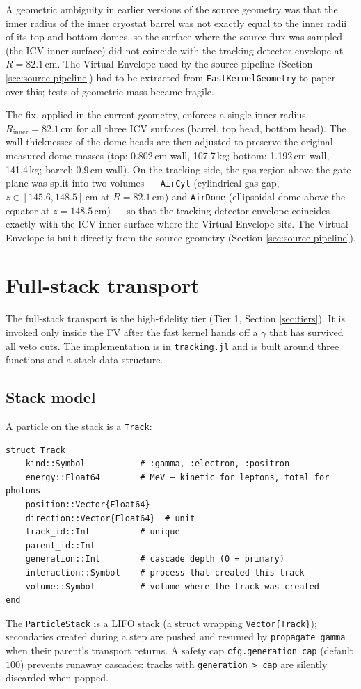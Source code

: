 \documentclass[11pt]{article}
\begin{document}
A geometric ambiguity in earlier versions of the source geometry was that
the inner radius of the inner cryostat barrel was not exactly equal to the
inner radii of its top and bottom domes, so the surface where the source
flux was sampled (the ICV inner surface) did not coincide with the tracking
detector envelope at $R = 82.1$\,cm. The Virtual Envelope used by the source
pipeline (Section \ref{sec:source-pipeline}) had to be extracted from
\texttt{FastKernelGeometry} to paper over this; tests of geometric mass
became fragile.

The fix, applied in the current geometry, enforces a single inner radius
$R_{\mathrm{inner}} = 82.1$\,cm for all three ICV surfaces (barrel, top
head, bottom head). The wall thicknesses of the dome heads are then adjusted
to preserve the original measured dome masses (top: 0.802\,cm wall, 107.7\,kg;
bottom: 1.192\,cm wall, 141.4\,kg; barrel: 0.9\,cm wall). On the tracking
side, the gas region above the gate plane was split into two volumes ---
\texttt{AirCyl} (cylindrical gas gap, $z \in [145.6, 148.5]$\,cm at
$R = 82.1$\,cm) and \texttt{AirDome} (ellipsoidal dome above the equator at
$z = 148.5$\,cm) --- so that the tracking detector envelope coincides
exactly with the ICV inner surface where the Virtual Envelope sits. The
Virtual Envelope is built directly from the source geometry (Section
\ref{sec:source-pipeline}).

\section{Full-stack transport}
\label{sec:fullstack}

The full-stack transport is the high-fidelity tier (Tier 1, Section
\ref{sec:tiers}). It is invoked only inside the FV after the fast kernel
hands off a $\gamma$ that has survived all veto cuts. The implementation is
in \texttt{tracking.jl} and is built around three functions and a stack
data structure.

\subsection{Stack model}
\label{sec:fullstack-stack}

A particle on the stack is a \texttt{Track}:
\begin{verbatim}
struct Track
    kind::Symbol           # :gamma, :electron, :positron
    energy::Float64        # MeV — kinetic for leptons, total for photons
    position::Vector{Float64}
    direction::Vector{Float64}  # unit
    track_id::Int          # unique
    parent_id::Int
    generation::Int        # cascade depth (0 = primary)
    interaction::Symbol    # process that created this track
    volume::Symbol         # volume where the track was created
end
\end{verbatim}
The \texttt{ParticleStack} is a LIFO stack (a struct wrapping
\texttt{Vector\{Track\}}); secondaries
created during a step are pushed and resumed by \texttt{propagate\_gamma}
when their parent's transport returns. A safety cap
\texttt{cfg.generation\_cap} (default $100$) prevents runaway cascades:
tracks with \texttt{generation > cap} are silently discarded when popped.
\end{document}
